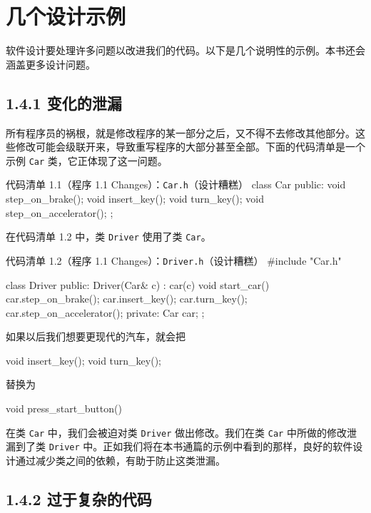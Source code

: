 \section{几个设计示例}

软件设计要处理许多问题以改进我们的代码。以下是几个说明性的示例。本书还会涵盖更多设计问题。

\subsection{1.4.1 变化的泄漏}

所有程序员的祸根，就是修改程序的某一部分之后，又不得不去修改其他部分。这些修改可能会级联开来，导致重写程序的大部分甚至全部。下面的代码清单是一个示例 \texttt{Car} 类，它正体现了这一问题。

\begin{codeboxt}{代码清单 1.1（程序 1.1 Changes）：\texttt{Car.h}（设计糟糕）}
class Car
{
public:
    void step_on_brake();
    void insert_key();
    void turn_key();
    void step_on_accelerator();
};
\end{codeboxt}

在代码清单 1.2 中，类 \texttt{Driver} 使用了类 \texttt{Car}。

\begin{codeboxt}{代码清单 1.2（程序 1.1 Changes）：\texttt{Driver.h}（设计糟糕）}
#include "Car.h"

class Driver
{
public:
    Driver(Car& c) : car(c) {}
    void start_car()
    {
        car.step_on_brake();
        car.insert_key();
        car.turn_key();
        car.step_on_accelerator();
    }
private:
    Car car;
};
\end{codeboxt}

如果以后我们想要更现代的汽车，就会把

\begin{codebox}
    void insert_key();
    void turn_key();
\end{codebox}

替换为

\begin{codebox}
    void press_start_button()
\end{codebox}

在类 \texttt{Car} 中，我们会被迫对类 \texttt{Driver} 做出修改。我们在类 \texttt{Car} 中所做的修改泄漏到了类 \texttt{Driver} 中。正如我们将在本书通篇的示例中看到的那样，良好的软件设计通过减少类之间的依赖，有助于防止这类泄漏。

\subsection{1.4.2 过于复杂的代码}

